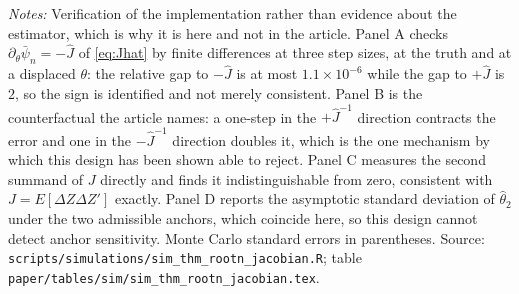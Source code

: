 \documentclass[
  12pt]{article}
\newcommand{\1}[1]{\mathds{1}\left[#1\right]}
\theoremstyle{plain}
\theoremstyle{definition}
\theoremstyle{definition}
\theoremstyle{remark}
\begin{document}
\begin{table}[!htbp]
\centering
\begin{threeparttable}
\caption{Verification of the Jacobian, its sign, and the anchor}
\label{tab:supp-jacobian}
\footnotesize
\setlength{\tabcolsep}{4pt}

\begin{tablenotes}\footnotesize
\item \textit{Notes:} Verification of the implementation rather than evidence
about the estimator, which is why it is here and not in the article. Panel A
checks $\partial_\theta\bar\psi_n=-\hat J$ of \eqref{eq:Jhat} by finite
differences at three step sizes, at the truth and at a displaced $\theta$: the
relative gap to $-\hat J$ is at most $1.1\times10^{-6}$ while the gap to
$+\hat J$ is $2$, so the sign is identified and not merely consistent. Panel B is
the counterfactual the article names: a one-step in the $+\hat J^{-1}$ direction
contracts the error and one in the $-\hat J^{-1}$ direction doubles it, which is
the one mechanism by which this design has been shown able to reject. Panel C
measures the second summand of $J$ directly and finds it indistinguishable from
zero, consistent with $J=E[\Delta Z\Delta Z']$ exactly. Panel D reports the
asymptotic standard deviation of $\hat\theta_2$ under the two admissible anchors,
which coincide here, so this design cannot detect anchor sensitivity. Monte Carlo
standard errors in parentheses. Source:
\texttt{scripts/simulations/sim\_thm\_rootn\_jacobian.R}; table
\texttt{paper/tables/sim/sim\_thm\_rootn\_jacobian.tex}.
\end{tablenotes}
\end{threeparttable}
\end{table}
\end{document}

